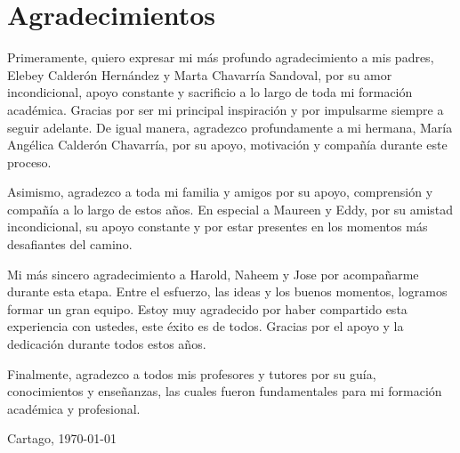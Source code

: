\chapter*{Agradecimientos}
\thispagestyle{empty}

Primeramente, quiero expresar mi más profundo agradecimiento a mis padres, Elebey Calderón Hernández y Marta Chavarría Sandoval, por su amor incondicional, apoyo constante y sacrificio a lo largo de toda mi formación académica. Gracias por ser mi principal inspiración y por impulsarme siempre a seguir adelante. De igual manera, agradezco profundamente a mi hermana, María Angélica Calderón Chavarría, por su apoyo, motivación y compañía durante este proceso.

Asimismo, agradezco a toda mi familia y amigos por su apoyo, comprensión y compañía a lo largo de estos años. En especial a Maureen y Eddy, por su amistad incondicional, su apoyo constante y por estar presentes en los momentos más desafiantes del camino.

Mi más sincero agradecimiento a Harold, Naheem y Jose por acompañarme durante esta etapa. Entre el esfuerzo, las ideas y los buenos momentos, logramos formar un gran equipo. Estoy muy agradecido por haber compartido esta experiencia con ustedes, este éxito es de todos. Gracias por el apoyo y la dedicación durante todos estos años.

Finalmente, agradezco a todos mis profesores y tutores por su guía, conocimientos y enseñanzas, las cuales fueron fundamentales para mi formación académica y profesional.
\vspace*{1cm}

\thesisAuthor

Cartago, \today

\cleardoublepage

